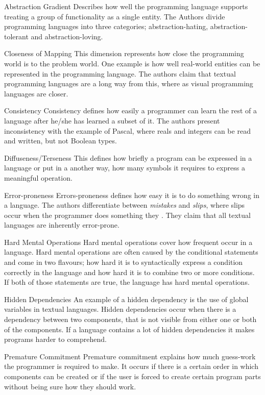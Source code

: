 \begin{labeling}{\quad\quad\quad}
\item[Abstraction Gradient] Describes how well the programming language supports treating a group of functionality as a single entity. The Authors divide programming languages into three categories; abstraction-hating, abstraction-tolerant and abstraction-loving.
\item[Closeness of Mapping] This dimension represents how close the programming world is to the problem world. One example is how well real-world entities can be represented in the programming language. The authors claim that textual programming languages are a long way from this, where as visual programming languages are closer.
\item[Consistency] Consistency defines how easily a programmer can learn the rest of a language after he/she has learned a subset of it. The authors present inconsistency with the example of Pascal, where reals and integers can be read and written, but not Boolean types.
\item[Diffuseness/Terseness] This defines how briefly a program can be expressed in a language or put in a another way, how many symbols it requires to express a meaningful operation.
\item[Error-proneness] Errors-proneness defines how easy it is to do something wrong in a language. The authors differentiate between \textit{mistakes} and \textit{slips}, where slips occur when the programmer does something they \textit{}. They claim that all textual languages are inherently error-prone.
\item[Hard Mental Operations] Hard mental operations cover how frequent  occur in a language. Hard mental operations are often caused by the conditional statements and come in two flavours; how hard it is to syntactically express a condition correctly in the language and how hard it is to combine two or more conditions. If both of those statements are true, the language has hard mental operations.
\item[Hidden Dependencies] An example of a hidden dependency is the use of global variables in textual languages. Hidden dependencies occur when there is a dependency between two components, that is not visible from either one or both of the components. If a language contains a lot of hidden dependencies it makes programs harder to comprehend.
\item[Premature Commitment] Premature commitment explains how much guess-work the programmer is required to make. It occurs if there is a certain order in which components can be created or if the user is forced to create certain program parts without being sure how they should work.

\end{labeling}
